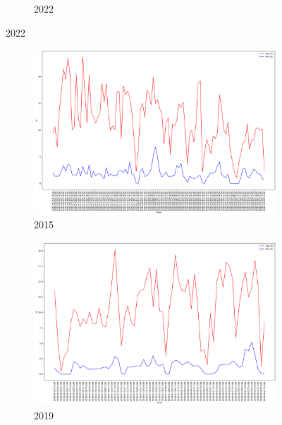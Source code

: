 \begin{figure}[h]
\begin{subfigure}{0.45\textwidth}
		\caption{2022}
	\end{subfigure}
	
	\label{fig:daily_dc_maxmin}
\end{figure}

\begin{figure}[h]
	\centering
	\caption{Daily max and min ISI values}
	\begin{subfigure}{0.45\textwidth}
		\centering
		\includegraphics[width=\textwidth]{graphs/2015/byHour/ISI_maxMin.png}
		\caption{2015}
	\end{subfigure}
	\hfill
	\begin{subfigure}{0.45\textwidth}
		\centering
		\includegraphics[width=\textwidth]{graphs/2019/byHour/ISI_maxMin.png}
		\caption{2019}
	\end{subfigure}
	\hfill
	\begin{subfigure}{0.45\textwidth}

\end{subfigure}
\end{figure}
